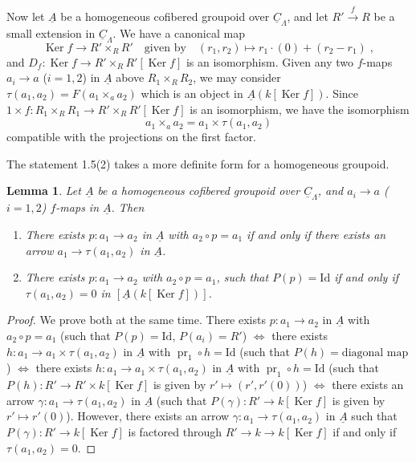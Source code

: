 \documentclass[11pt]{article}
\theoremstyle{plain}
\newtheorem{lemma}[theorem]{Lemma}
\theoremstyle{definition}
\theoremstyle{remark}
\DeclareMathOperator{\Ker}{Ker}
\newcommand{\uA}{\underline{A}}\newcommand{\uH}{\underline{H}}\newcommand{\uExt}{\underline{\operatorname{Ext}}}\newcommand{\uL}{\underline{L}}\newcommand{\uM}{\underline{M}}\newcommand{\uZ}{\underline{Z}}\newcommand{\uB}{\underline{B}}\newcommand{\uC}{\underline{C}}\newcommand{\uD}{\underline{D}}\newcommand{\uE}{\underline{E}}\newcommand{\uG}{\underline{G}}\newcommand{\uP}{\underline{P}}\newcommand{\uQ}{\underline{Q}}
\begin{document}
Now let $\uA$ be a homogeneous cofibered groupoid over $\underline{C}_{\Lambda}$, and let $R' \xrightarrow{f} R$ be a small extension in $\underline{C}_{\Lambda}$. We have a canonical map
\[
\Ker f \longrightarrow R' \times_R R' \quad \text{given by} \quad (r_1, r_2) \longmapsto r_1 \cdot (0) + (r_2 - r_1)\;,
\]
and $D_f : \Ker f \to R' \times_R R'[\Ker f]$ is an isomorphism. Given any two $f$-maps $a_i \to a$ ($i = 1,2$) in $\uA$ above $R_1 \times_R R_2$, we may consider $\tau(a_1, a_2) = F(a_1 \times_a a_2)$ which is an object in $\uA(k[\Ker f])$. Since $1 \times f : R_1 \times_R R_1 \to R' \times_R R'[\Ker f]$ is an isomorphism, we have the isomorphism
\[
a_1 \times_a a_2 = a_1 \times \tau(a_1, a_2)
\]
compatible with the projections on the first factor.

The statement 1.5(2) takes a more definite form for a homogeneous groupoid.

\begin{lemma}
Let $\uA$ be a homogeneous cofibered groupoid over $\underline{C}_{\Lambda}$, and $a_i \to a$ ($i = 1,2$) $f$-maps in $\uA$. Then
\begin{enumerate}
\item[(1)] There exists $p : a_1 \to a_2$ in $\uA$ with $a_2 \circ p = a_1$ if and only if there exists an arrow $a_1 \to \tau(a_1, a_2)$ in $\uA$.
\item[(2)] There exists $p : a_1 \to a_2$ with $a_2 \circ p = a_1$, such that $P(p) = \text{Id}$ if and only if $\tau(a_1, a_2) = 0$ in $[\uA(k[\Ker f])]$.
\end{enumerate}
\end{lemma}

\begin{proof}
We prove both at the same time. There exists $p : a_1 \to a_2$ in $\uA$ with $a_2 \circ p = a_1$ (such that $P(p) = \text{Id}$, $P(a_i) = R'$) $\Leftrightarrow$ there exists $h : a_1 \to a_1 \times \tau(a_1, a_2)$ in $\uA$ with $\operatorname{pr}_1 \circ h = \text{Id}$ (such that $P(h) = \text{diagonal map}$) $\Leftrightarrow$ there exists $h : a_1 \to a_1 \times \tau(a_1, a_2)$ in $\uA$ with $\operatorname{pr}_1 \circ h = \text{Id}$ (such that $P(h) : R' \to R' \times k[\Ker f]$ is given by $r' \mapsto (r', r'(0))$) $\Leftrightarrow$ there exists an arrow $\gamma : a_1 \to \tau(a_1, a_2)$ in $\uA$ (such that $P(\gamma) : R' \to k[\Ker f]$ is given by $r' \mapsto r'(0)$). However, there exists an arrow $\gamma : a_1 \to \tau(a_1, a_2)$ in $\uA$ such that $P(\gamma) : R' \to k[\Ker f]$ is factored through $R' \to k \to k[\Ker f]$ if and only if $\tau(a_1, a_2) = 0$.
\end{proof}
\end{document}
